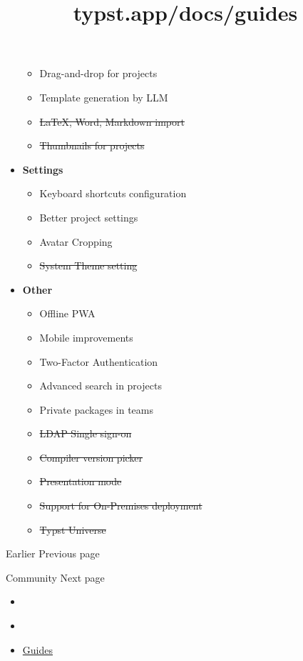 \begin{itemize}
  \begin{itemize}
  \tightlist
  \item
    Drag-and-drop for projects
  \item
    Template generation by LLM
  \item
    \st{LaTeX, Word, Markdown import}
  \item
    \st{Thumbnails for projects}
  \end{itemize}
\item
  \textbf{Settings}

  \begin{itemize}
  \tightlist
  \item
    Keyboard shortcuts configuration
  \item
    Better project settings
  \item
    Avatar Cropping
  \item
    \st{System Theme setting}
  \end{itemize}
\item
  \textbf{Other}

  \begin{itemize}
  \tightlist
  \item
    Offline PWA
  \item
    Mobile improvements
  \item
    Two-Factor Authentication
  \item
    Advanced search in projects
  \item
    Private packages in teams
  \item
    \st{LDAP Single sign-on}
  \item
    \st{Compiler version picker}
  \item
    \st{Presentation mode}
  \item
    \st{Support for On-Premises deployment}
  \item
    \st{Typst Universe}
  \end{itemize}
\end{itemize}

\href{/docs/changelog/earlier/}{\pandocbounded{}}

{ Earlier } { Previous page }

\href{/docs/community/}{\pandocbounded{}}

{ Community } { Next page }


\title{typst.app/docs/guides}

\begin{itemize}
\tightlist
\item
  \href{/docs}{}
\item
  
\item
  \href{/docs/guides/}{Guides}
\end{itemize}

